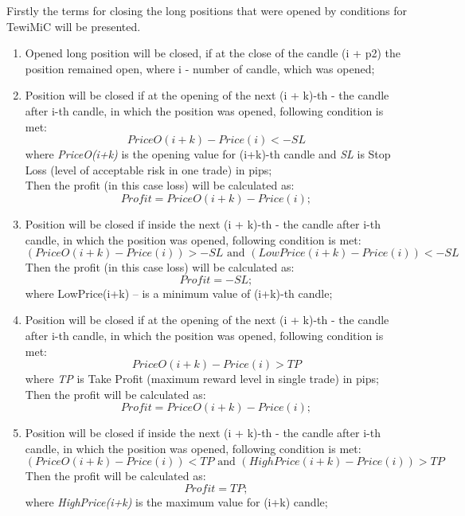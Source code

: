 \documentclass{tewiart}
\begin{document}
\noindent Firstly the terms for closing the long positions that were opened by conditions for TewiMiC will be presented.
\begin{enumerate}
\item Opened long position will be closed, if at the close of the candle (i + p2) the position remained open, where i - number of candle, which was opened;

\item Position will be closed if at the opening of the next (i + k)-th - the candle after i-th candle, in which the position was opened, following condition is met: 
\begin{equation}
PriceO(i+k)-Price(i) <-SL
\end{equation} 
where \textit{PriceO(i+k)} is the opening value for (i+k)-th candle and \textit{SL} is Stop Loss (level of acceptable risk in one trade) in pips;\\
Then the profit (in this case loss) will be calculated as:
\begin{equation}
Profit =PriceO (i+k)-Price(i);
\end{equation}

\item Position will be closed if inside the next (i + k)-th - the candle after i-th candle, in which the position was opened, following condition is met: 
\begin{equation}
(PriceO(i+k)-Price(i) )>-SL \text{ and } (LowPrice(i+k)-Price(i))<-SL
\end{equation} 
Then the profit (in this case loss) will be calculated as:
\begin{equation}
Profit =-SL;
\end{equation}
where LowPrice(i+k) – is a minimum value of (i+k)-th candle;

\item Position will be closed if at the opening of the next (i + k)-th - the candle after i-th candle, in which the position was opened, following condition is met: 
\begin{equation}
PriceO(i+k)-Price(i)>TP
\end{equation} 
where \textit{TP} is Take Profit (maximum reward level in single trade) in pips;\\
Then the profit will be calculated as:
\begin{equation}
Profit =PriceO (i+k)-Price(i);
\end{equation}

\item Position will be closed if inside the next (i + k)-th - the candle after i-th candle, in which the position was opened, following condition is met: 
\begin{equation}
(PriceO(i+k)-Price(i) )<TP \text{ and } (HighPrice(i+k)-Price(i))>TP
\end{equation} 
Then the profit will be calculated as:
\begin{equation}
Profit =TP;
\end{equation}
where \textit{HighPrice(i+k)} is the maximum value for (i+k) candle;


\end{enumerate}
\end{document}
